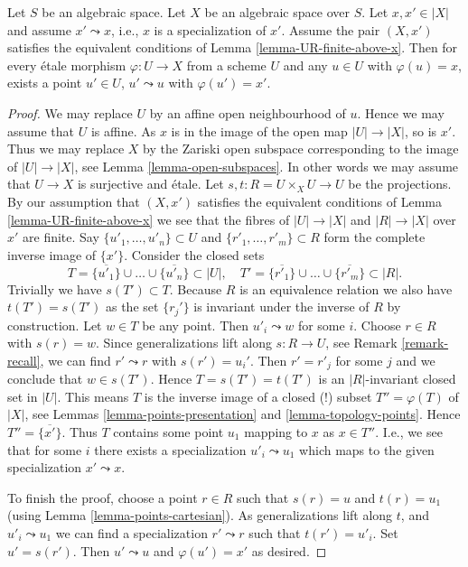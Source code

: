 \begin{lemma}
\label{lemma-specialization}
Let $S$ be an algebraic space.
Let $X$ be an algebraic space over $S$.
Let $x, x' \in |X|$ and assume $x' \leadsto x$, i.e., $x$ is a
specialization of $x'$.
Assume the pair $(X, x')$ satisfies the equivalent conditions
of Lemma \ref{lemma-UR-finite-above-x}. Then
for every \'etale morphism $\varphi : U \to X$ from a scheme $U$ and any
$u \in U$ with $\varphi(u) = x$, exists a point $u'\in U$,
$u' \leadsto u$ with $\varphi(u') = x'$.
\end{lemma}

\begin{proof}
We may replace $U$ by an affine open neighbourhood of $u$.
Hence we may assume that $U$ is affine. As $x$ is in the
image of the open map $|U| \to |X|$, so is $x'$. Thus we may
replace $X$ by the Zariski open subspace corresponding to
the image of $|U| \to |X|$, see
Lemma \ref{lemma-open-subspaces}.
In other words we may assume that
$U \to X$ is surjective and \'etale.
Let $s, t : R = U \times_X U \to U$ be the projections.
By our assumption that $(X, x')$ satisfies the equivalent conditions
of Lemma \ref{lemma-UR-finite-above-x} we see that the fibres
of $|U| \to |X|$ and $|R| \to |X|$
over $x'$ are finite. Say $\{u'_1, \ldots, u'_n\} \subset U$ and
$\{r'_1, \ldots, r'_m\} \subset R$ form the complete inverse image
of $\{x'\}$.
Consider the closed sets
$$
T = \overline{\{u'_1\}} \cup \ldots \cup \overline{\{u'_n\}} \subset |U|,
\quad
T' = \overline{\{r'_1\}} \cup \ldots \cup \overline{\{r'_m\}} \subset |R|.
$$
Trivially we have $s(T') \subset T$. Because $R$ is an equivalence
relation we also have $t(T') = s(T')$ as the set $\{r_j'\}$
is invariant under the inverse of $R$ by construction. Let $w \in T$
be any point. Then $u'_i \leadsto w$ for some $i$. Choose $r \in R$
with $s(r) = w$. Since generalizations lift along $s : R \to U$, see
Remark \ref{remark-recall}, we can find $r' \leadsto r$ with
$s(r') = u_i'$. Then $r' = r'_j$ for some $j$ and we conclude that
$w \in s(T')$. Hence $T = s(T') = t(T')$ is an $|R|$-invariant closed
set in $|U|$. This means $T$ is the inverse image of a closed (!)
subset $T'' = \varphi(T)$ of $|X|$, see
Lemmas \ref{lemma-points-presentation} and \ref{lemma-topology-points}.
Hence $T'' = \overline{\{x'\}}$.
Thus $T$ contains some point $u_1$ mapping to $x$ as $x \in T''$.
I.e., we see that for some $i$ there exists a specialization
$u'_i \leadsto u_1$ which maps to the given specialization
$x' \leadsto x$.

\medskip\noindent
To finish the proof, choose a point $r \in R$ such that
$s(r) = u$ and $t(r) = u_1$ (using Lemma \ref{lemma-points-cartesian}).
As generalizations lift along $t$, and $u'_i \leadsto u_1$
we can find a specialization $r' \leadsto r$ such that $t(r') = u'_i$.
Set $u' = s(r')$. Then $u' \leadsto u$ and $\varphi(u') = x'$ as
desired.
\end{proof}

